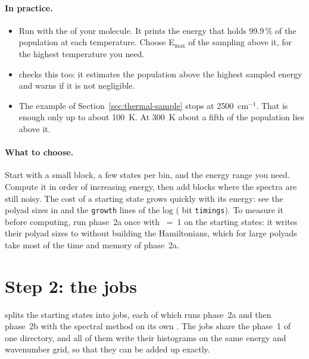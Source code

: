\paragraph{In practice.}
\begin{itemize}
\item Run  with the  of your
molecule. It prints the energy that holds 99.9\,\% of the population at
each temperature. Choose E$_\mathrm{max}$ of the sampling above it, for
the highest temperature you need.
\item {} checks this too: it estimates the
population above the highest sampled energy and warns if it is not
negligible.
\item The example of Section~\ref{sec:thermal-sample} stops at
2500~cm$^{-1}$. That is enough only up to about 100~K. At 300~K about a
fifth of the population lies above it.
\end{itemize}

\paragraph{What to choose.} Start with a small block, a few states per
bin, and the energy range you need. Compute it in order of increasing
energy, then add blocks where the spectra are still noisy. The cost of a
starting state grows quickly with its energy: see the polyad sizes in
 and the \texttt{growth} lines of the log
( bit \texttt{timings}). To measure it before computing,
run phase~2a once with ~=~1 on the starting states: it
writes their polyad sizes to  without building the
Hamiltonians, which for large polyads take most of the time and
memory of phase~2a.

\section{Step 2: the jobs}\label{sec:thermal-jobs}

 splits the starting states into jobs, each of which
runs phase~2a and then phase~2b with the spectral method on its own
. The jobs share the phase~1 of one directory, and all of
them write their histograms on the same energy and wavenumber grid, so
that they can be added up exactly.

